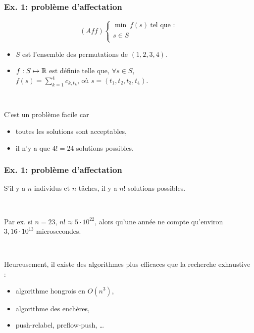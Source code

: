 \documentclass{beamer}
\newcommand{\R}{{\ensuremath\mathbb{R}}}
\begin{document}
\begin{frame}
  \frametitle{Ex. 1: problème d'affectation}

  \[
  (Aff) \left\{
  \begin{array}{c}
    \min \ f(s) \ \text{tel que :} \\
    s \in S \\
  \end{array}
  \right.
  \]

  \begin{itemize}
  \item $S$ est l'ensemble des permutations de $(1,2,3,4)$. 
  \item $f : S \mapsto \R$ est définie telle que, $\forall s \in S$, \\
    $f(s) = \sum_{k=1}^4 c_{k,t_k}$, où $s = (t_1,t_2,t_3,t_4)$.  
  \end{itemize}

  ~
  
  C'est un problème facile car
  \begin{itemize}
  \item toutes les solutions sont acceptables,
  \item il n'y a que $4! = 24$ solutions possibles. 
  \end{itemize}

\end{frame}

\begin{frame}
  \frametitle{Ex. 1: problème d'affectation}

  S'il y a $n$ individus et $n$ tâches,
  il y a $n!$ solutions possibles. 

  ~
  
  Par ex. si $n = 23$, $n! \approx 5 \cdot 10^{22}$, alors qu'une
  année ne compte qu'environ $3,16 \cdot 10^{13}$ microsecondes.

  ~
  
  Heureusement, il existe des algorithmes plus efficaces
  que la recherche exhaustive :
  \begin{itemize}
  \item algorithme hongrois en $O(n^3)$,
  \item algorithme des enchères,
  \item push-relabel, preflow-push, \dots
  \end{itemize}
  
\end{frame}
\end{document}
